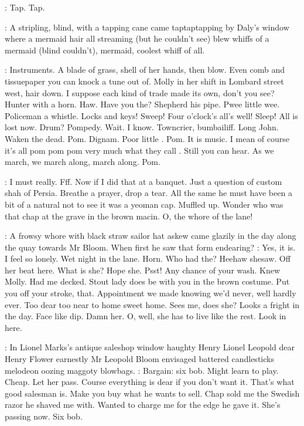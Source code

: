 \stripling:
Tap. Tap.

:
A stripling, blind, with a tapping cane came taptaptapping
by Daly's window where a mermaid hair all streaming (but he couldn't see)
blew whiffs of a mermaid (blind couldn't), mermaid, coolest whiff of all.

\BloomInt:
Instruments. A blade of grass, shell of her hands, then blow. Even
comb and tissuepaper you can knock a tune out of. Molly in her shift in
Lombard street west, hair down. I suppose each kind of trade made its own,
don't you see?
Hunter with a horn. Haw. Have you the?
Shepherd his pipe. Pwee little wee. Policeman a whistle. Locks and keys!
Sweep! Four o'clock's all's well! Sleep! All is lost now. Drum? Pompedy.
Wait. I know. Towncrier, bumbailiff. Long John. Waken the dead. Pom.
Dignam. Poor little .
Pom. It is music. I mean of course it's
all pom pom pom very much what they call
. Still you can hear. As
we march, we march along, march along. Pom.

\BloomInt:
I must really. Fff. Now if I did that at a banquet. Just a question of
custom shah of Persia. Breathe a prayer, drop a tear. All the same he must
have been a bit of a natural not to see it was a yeoman cap. Muffled up.
Wonder who was that chap at the grave in the brown macin.
O, the whore of the lane!

:
A frowsy whore with black straw sailor hat askew came glazily in the
day along the quay towards Mr Bloom. When first he saw that form
endearing?
\BloomInt:
Yes, it is. I feel so lonely. Wet night in the lane. Horn. Who
had the? Heehaw shesaw. Off her beat here. What is she? Hope she. Psst!
Any chance of your wash. Knew Molly. Had me decked. Stout lady does be
with you in the brown costume. Put you off your stroke, that. Appointment
we made knowing we'd never, well hardly ever. Too dear too near to home
sweet home. Sees me, does she? Looks a fright in the day. Face like dip.
Damn her.
O, well, she has to live like the rest. Look in here.

:
In Lionel Marks's antique saleshop window haughty Henry Lionel
Leopold dear Henry Flower earnestly Mr Leopold Bloom envisaged
battered candlesticks melodeon oozing maggoty blowbags.
\BloomInt:
Bargain: six bob.
Might learn to play. Cheap. Let her pass. Course everything is dear if
you don't want it. That's what good salesman is. Make you buy what he
wants to sell. Chap sold me the Swedish razor he shaved me with. Wanted
to charge me for the edge he gave it. She's passing now. Six bob.

